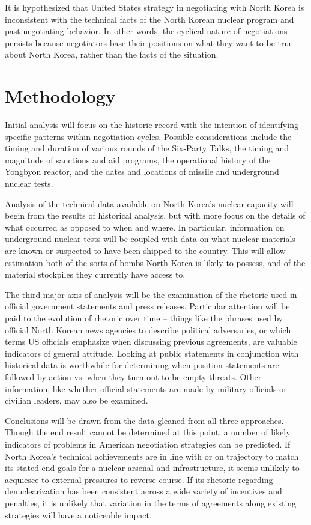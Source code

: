 \documentclass[titlepage]{article}
\begin{document}
It is hypothesized that United States strategy in negotiating with North Korea is inconsistent with the technical facts of the North Korean nuclear program and past negotiating behavior. In other words, the cyclical nature of negotiations persists because negotiators base their positions on what they want to be true about North Korea, rather than the facts of the situation.

\section{Methodology}

Initial analysis will focus on the historic record with the intention of identifying specific patterns within negotiation cycles. Possible considerations include the timing and duration of various rounds of the Six-Party Talks, the timing and magnitude of sanctions and aid programs, the operational history of the Yongbyon reactor, and the dates and locations of missile and underground nuclear tests.

Analysis of the technical data available on North Korea’s nuclear capacity will begin from the results of historical analysis, but with more focus on the details of what occurred as opposed to when and where. In particular, information on underground nuclear tests will be coupled with data on what nuclear materials are known or suspected to have been shipped to the country. This will allow estimation both of the sorts of bombs North Korea is likely to possess, and of the material stockpiles they currently have access to.

The third major axis of analysis will be the examination of the rhetoric used in official government statements and press releases. Particular attention will be paid to the evolution of rhetoric over time – things like the phrases used by official North Korean news agencies to describe political adversaries, or which terms US officials emphasize when discussing previous agreements, are valuable indicators of general attitude. Looking at public statements in conjunction with historical data is worthwhile for determining when position statements are followed by action vs. when they turn out to be empty threats. Other information, like whether official statements are made by military officials or civilian leaders, may also be examined.

Conclusions will be drawn from the data gleaned from all three approaches. Though the end result cannot be determined at this point, a number of likely indicators of problems in American negotiation strategies can be predicted. If North Korea's technical achievements are in line with or on trajectory to match its stated end goals for a nuclear arsenal and infrastructure, it seems unlikely to acquiesce to external pressures to reverse course. If its rhetoric regarding denuclearization has been consistent across a wide variety of incentives and penalties, it is unlikely that variation in the terms of agreements along existing strategies will have a noticeable impact.
\end{document}
